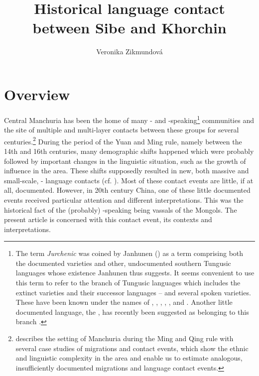 \documentclass[output=paper,colorlinks,citecolor=brown]{langscibook}
\title{Historical language contact between Sibe and Khorchin}
\author{Veronika Zikmundová\affiliation{Charles University}}
\begin{document}
\maketitle

\section{Overview}\label{section9.1}\largerpage

Central Manchuria has been the home of many - and -speak\-ing\footnote{The term \textit{Jurchenic} was coined by Janhunen (\citeyear[154]{Janhunen1996}) as a term comprising both the documented  varieties and other, undocumented southern Tungusic languages whose existence Janhunen thus suggests. It seems convenient to use this term to refer to the branch of Tungusic languages which includes the extinct  varieties and their successor languages –  and several spoken  varieties. These have been known under the names of , , , , ,  and . Another little documented language, the , has recently been suggested as belonging to this branch \citep{HölzlHölzl2019a}.} communities and the site of multiple and multi-layer contacts between these groups for several centuries.\footnote{\citet[96--110]{Janhunen1996} describes the setting of Manchuria during the Ming and Qing rule with several case studies of migrations and contact events, which show the ethnic and linguistic complexity in the area and enable us to estimate analogous, insufficiently documented migrations and language contact events.} During the period of the Yuan and Ming rule, namely between the 14th and 16th centuries, many demographic shifts happened which were probably followed by important changes in the linguistic situation, such as the growth of  influence in the area. These shifts supposedly resulted in new, both massive and small-scale, - language contacts (cf. \citealt[97]{Janhunen1996}). Most of these contact events are little, if at all, documented. However, in 20th century China, one of these little documented events received particular attention and different interpretations. This was the historical fact of the (probably) -speaking  being vassals of the  Mongols. The present article is concerned with this contact event, its contexts and interpretations.
\end{document}
